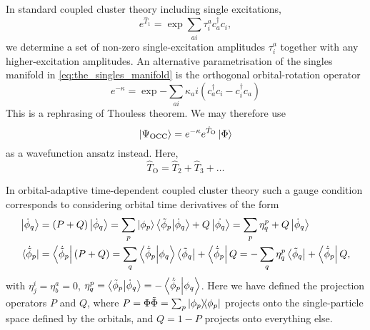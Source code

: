 \begin{tcolorbox}[title={Orbital-optimised and Bruecker coupled cluster theories
    \cite{krylov1998size,pedersen1999gauge}}, 
    colback={white},
    colbacktitle={pink},
    coltitle={black}]

    In standard coupled cluster theory including single excitations,
    \begin{equation}
        \label{eq:the_singles_manifold}
        e^{\hat{T}_1} = \exp{\sum_{ai}\tau^a_ic^\dagger_ac_i},
    \end{equation} 
    we determine a set of non-zero single-excitation amplitudes $\tau^a_i$
    together with any 
    higher-excitation amplitudes.
    An alternative parametrisation of the singles manifold
    in \autoref{eq:the_singles_manifold} is the orthogonal orbital-rotation 
    operator
    \begin{equation}
        \label{eq:the_orbital rotator}
        e^{-\kappa} = \exp{ 
            - \sum_{ai} \kappa_ai(c^\dagger_a c_i - c^\dagger_i c_a)     
        }
    \end{equation}
    This is a rephrasing of Thouless
    theorem\cite{thouless1960stability}. We may therefore use 
    \begin{equation}
       \ket{\Psi_{\text{OCC}}} = e^{-\kappa}e^{\hat{T}_{\text{O}}}\ket{\Phi}
    \end{equation}
    as a wavefunction ansatz instead. Here,
    \begin{equation}
        \hat{T}_{\text{O}} = \hat{T}_2 + \hat{T}_3 + \dots
    \end{equation}

\end{tcolorbox}

In orbital-adaptive time-dependent coupled cluster theory such a gauge condition corresponds
to considering orbital time derivatives of the form
\begin{align}
    \label{eq:orbital_time_derivative_ket}
    \ket{\dot{\phi}_q} &= (P + Q)\ket{\dot{\phi}_q}
        = \sum_p \ket{\phi_p}\braket{\tilde{\phi}_p}{\dot{\phi}_q} 
            + Q\ket{\dot{\phi_q}}
        = \sum_p\eta^p_q + Q\ket{\dot{\phi}_q}\\
    \label{eq:orbital_time_derivative_bra}
    \bra*{\dot{\tilde{\phi}}_p} &= \bra{\dot{\tilde{\phi}}_p}(P + Q)
        = \sum_q \braket{\dot{\tilde{\phi}}_p}{\phi_q}\bra{\tilde{\phi}_q}
            + \bra{\dot{\tilde{\phi}}_p}Q
        = - \sum_q \eta^p_q \bra{\tilde{\phi}_q} + \bra{\dot{\tilde{\phi}}_p}Q,
\end{align}
with $\eta^i_j = \eta^a_b = 0$,
$\eta^p_q = \braket{\tilde{\phi}_p}{\dot{\phi}_q} = - \braket{\dot{\tilde{\phi}}_p}{\phi_q}$.
Here we have defined the projection operators $P$ and $Q$, where 
$P = \Phi\tilde{\Phi} = \sum_p \dyad{\phi_p}{\phi_p}$ projects onto the single-particle 
space defined by the orbitals, and $Q = 1 - P$ projects onto everything else.

